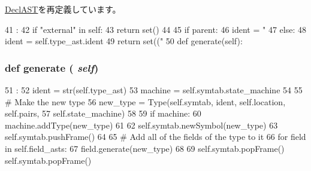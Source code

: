 \hyperlink{classslicc_1_1ast_1_1DeclAST_1_1DeclAST_a35b1a87f6fcbddeb5b793b0e415765f8}{DeclAST}を再定義しています。


\begin{DoxyCode}
41                                 :
42         if "external" in self:
43             return set()
44 
45         if parent:
46             ident = "%
47         else:
48             ident = self.type_ast.ident
49         return set(("%
50 
    def generate(self):
\end{DoxyCode}
\hypertarget{classslicc_1_1ast_1_1TypeDeclAST_1_1TypeDeclAST_a4555d1cee0dccf3942ea35fe86de2e8e}{
\subsubsection[{generate}]{\setlength{\rightskip}{0pt plus 5cm}def generate ( {\em self})}}
\label{classslicc_1_1ast_1_1TypeDeclAST_1_1TypeDeclAST_a4555d1cee0dccf3942ea35fe86de2e8e}



\begin{DoxyCode}
51                       :
52         ident = str(self.type_ast)
53         machine = self.symtab.state_machine
54 
55         # Make the new type
56         new_type = Type(self.symtab, ident, self.location, self.pairs,
57                         self.state_machine)
58 
59         if machine:
60             machine.addType(new_type)
61 
62         self.symtab.newSymbol(new_type)
63         self.symtab.pushFrame()
64 
65         # Add all of the fields of the type to it
66         for field in self.field_asts:
67             field.generate(new_type)
68 
69         self.symtab.popFrame()
        self.symtab.popFrame()
\end{DoxyCode}


